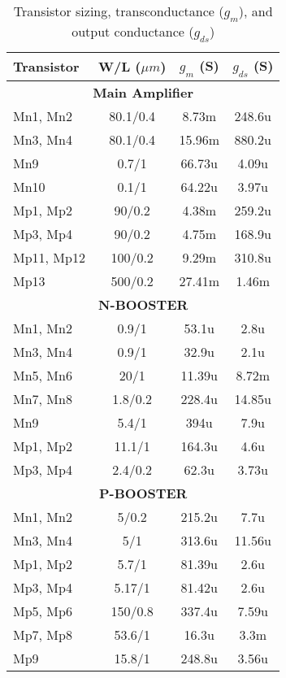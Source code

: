 \documentclass[a4paper,12pt]{article}
\begin{document}
\begin{table}[h]
    \centering
    \begin{tabular}{|l|c|c|c|}
        \hline
        Transistor & W/L ($\mu m$) & $g_m$ (S) & $g_{ds}$ (S) \\
        \hline
        \multicolumn{4}{|c|}{\textbf{Main Amplifier}} \\
        \hline
        Mn1, Mn2 & 80.1/0.4 & 8.73m & 248.6u \\
        Mn3, Mn4 & 80.1/0.4 & 15.96m & 880.2u \\
        Mn9 & 0.7/1 & 66.73u & 4.09u \\
        Mn10 & 0.1/1 & 64.22u & 3.97u \\
        Mp1, Mp2 & 90/0.2 & 4.38m & 259.2u \\
        Mp3, Mp4 & 90/0.2 & 4.75m & 168.9u \\
        Mp11, Mp12 & 100/0.2 & 9.29m & 310.8u \\
        Mp13 & 500/0.2 & 27.41m & 1.46m \\
        \hline
        \multicolumn{4}{|c|}{\textbf{N-BOOSTER}} \\
        \hline
        Mn1, Mn2 & 0.9/1 & 53.1u & 2.8u \\
        Mn3, Mn4 & 0.9/1 & 32.9u & 2.1u \\
        Mn5, Mn6 & 20/1 & 11.39u & 8.72m \\
        Mn7, Mn8 & 1.8/0.2 & 228.4u & 14.85u \\
        Mn9 & 5.4/1 & 394u & 7.9u \\
        Mp1, Mp2 & 11.1/1 & 164.3u & 4.6u \\
        Mp3, Mp4 & 2.4/0.2 & 62.3u & 3.73u \\
        \hline
        \multicolumn{4}{|c|}{\textbf{P-BOOSTER}} \\
        \hline
        Mn1, Mn2 & 5/0.2 & 215.2u & 7.7u \\
        Mn3, Mn4 & 5/1 & 313.6u & 11.56u \\
        Mp1, Mp2 & 5.7/1 & 81.39u & 2.6u \\
        Mp3, Mp4 & 5.17/1 & 81.42u & 2.6u \\
        Mp5, Mp6 & 150/0.8 & 337.4u & 7.59u \\
        Mp7, Mp8 & 53.6/1 & 16.3u & 3.3m \\
        Mp9 & 15.8/1 & 248.8u & 3.56u \\
        \hline
    \end{tabular}
    \caption{Transistor sizing, transconductance ($g_m$), and output conductance ($g_{ds}$)}
    \label{tab:transistor_specs}
\end{table}
\end{document}
